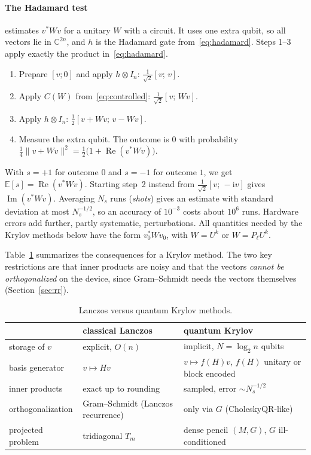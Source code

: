 \documentclass[11pt,a4paper]{article}
\newcommand{\C}{\mathbb{C}}
\begin{document}
\paragraph{The Hadamard test} estimates $v^*Wv$ for a unitary $W$ with a
circuit. It uses one extra qubit, so all vectors lie in $\C^{2n}$, and $h$ is
the Hadamard gate from~\eqref{eq:hadamard}. Steps 1--3 apply exactly the product in~\eqref{eq:hadamard}.
\begin{enumerate}
\item Prepare $[v;0]$ and apply $h\otimes I_n$: \quad $\tfrac1{\sqrt2}[v;\,v]$.
\item Apply $C(W)$ from~\eqref{eq:controlled}: \quad $\tfrac1{\sqrt2}[v;\,Wv]$.
\item Apply $h\otimes I_n$: \quad $\tfrac12[v+Wv;\,v-Wv]$.
\item Measure the extra qubit. The outcome is $0$ with probability
  $\tfrac14\|v+Wv\|^2=\tfrac12\big(1+\operatorname{Re}(v^*Wv)\big)$.
\end{enumerate}
With $s=+1$ for outcome $0$ and $s=-1$ for outcome $1$, we get
$\mathbb{E}[s]=\operatorname{Re}(v^*Wv)$. Starting step~2 instead from
$\tfrac1{\sqrt2}[v;\,-\mathrm{i}v]$ gives $\operatorname{Im}(v^*Wv)$. Averaging
$N_s$ runs (\emph{shots}) gives an estimate with standard deviation at
most $N_s^{-1/2}$, so an accuracy of $10^{-3}$ costs about $10^6$ runs.
Hardware errors add further, partly systematic, perturbations. All
quantities needed by the Krylov methods below have the form $v_0^*Wv_0$,
with $W=U^k$ or $W=P_\ell U^k$.

Table~\ref{tab:compare} summarizes the consequences for a Krylov method.
The two key restrictions are that inner products are noisy and that the
vectors \emph{cannot be orthogonalized} on the device, since
Gram--Schmidt needs the vectors themselves (Section~\ref{sec:rr}).

\begin{table}[t]
\centering
\small
\begin{tabular}{@{}lll@{}}
\toprule
 & classical Lanczos & quantum Krylov \\ \midrule
storage of $v$ & explicit, $O(n)$ & implicit, $N=\log_2 n$ qubits\\
basis generator & $v\mapsto Hv$ & $v\mapsto f(H)v$, $f(H)$ unitary or block encoded\\
inner products & exact up to rounding & sampled, error $\sim N_s^{-1/2}$\\
orthogonalization & Gram--Schmidt (Lanczos recurrence) & only via $G$ (CholeskyQR-like) \\
projected problem & tridiagonal $T_m$ & dense pencil $(M,G)$, $G$ ill-conditioned\\
\bottomrule
\end{tabular}
\caption{Lanczos versus quantum Krylov methods.}
\label{tab:compare}
\end{table}
\end{document}
